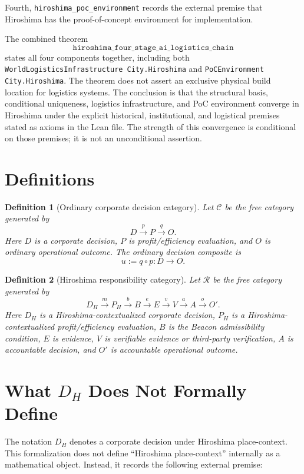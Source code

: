 \documentclass[11pt]{article}
\newtheorem{definition}{Definition}
\begin{document}
Fourth, \texttt{hiroshima\_poc\_environment} records the external premise that
Hiroshima has the proof-of-concept environment for implementation.

The combined theorem
\[
\texttt{hiroshima\_four\_stage\_ai\_logistics\_chain}
\]
states all four components together, including both
\texttt{WorldLogisticsInfrastructure City.Hiroshima} and
\texttt{PoCEnvironment City.Hiroshima}.  The theorem does not assert an
exclusive physical build location for logistics systems.  The conclusion is
that the
structural basis, conditional uniqueness, logistics infrastructure, and PoC
environment converge in Hiroshima under the explicit historical,
institutional, and logistical premises stated as axioms in the Lean file.  The
strength of this convergence is conditional on those premises; it is not an
unconditional assertion.

\section*{Definitions}

\begin{definition}[Ordinary corporate decision category]
Let $\mathcal{C}$ be the free category generated by
\[
  D \xrightarrow{p} P \xrightarrow{q} O.
\]
Here $D$ is a corporate decision, $P$ is profit/efficiency evaluation, and $O$
is ordinary operational outcome.  The ordinary decision composite is
\[
  u:=q\circ p:D\to O.
\]
\end{definition}

\begin{definition}[Hiroshima responsibility category]
Let $\mathcal{R}$ be the free category generated by
\[
  D_H \xrightarrow{m} P_H \xrightarrow{b} B
  \xrightarrow{e} E \xrightarrow{v} V \xrightarrow{a} A
  \xrightarrow{o} O'.
\]
Here $D_H$ is a Hiroshima-contextualized corporate decision, $P_H$ is a
Hiroshima-contextualized profit/efficiency evaluation, $B$ is the Beacon
admissibility condition, $E$ is evidence, $V$ is verifiable evidence or
third-party verification, $A$ is accountable decision, and $O'$ is accountable
operational outcome.
\end{definition}

\section*{What $D_H$ Does Not Formally Define}

The notation $D_H$ denotes a corporate decision under Hiroshima place-context.
This formalization does not define ``Hiroshima place-context'' internally as a
mathematical object.  Instead, it records the following external premise:
\end{document}
